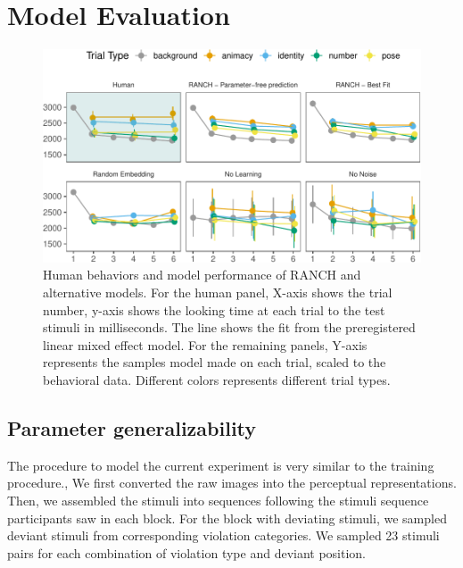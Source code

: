 \documentclass[10pt, letterpaper]{article}
\newenvironment{CodeChunk}{}{}
\begin{document}
\hypertarget{model-evaluation}{%
\section{Model Evaluation}\label{model-evaluation}}

\begin{CodeChunk}
\begin{figure}[h!]

{\centering \includegraphics{figs/lol-1} 

}

\caption[Human behaviors and model performance of RANCH and alternative models]{Human behaviors and model performance of RANCH and alternative models. For the human panel, X-axis shows the trial number, y-axis shows the looking time at each trial to the test stimuli in milliseconds. The line shows the fit from the preregistered linear mixed effect model. For the remaining panels, Y-axis represents the samples model made on each trial, scaled to the behavioral data. Different colors represents different trial types.}\label{fig:lol}
\end{figure}
\end{CodeChunk}

\hypertarget{parameter-generalizability}{%
\subsection{Parameter
generalizability}\label{parameter-generalizability}}

The procedure to model the current experiment is very similar to the
training procedure., We first converted the raw images into the
perceptual representations. Then, we assembled the stimuli into
sequences following the stimuli sequence participants saw in each block.
For the block with deviating stimuli, we sampled deviant stimuli from
corresponding violation categories. We sampled 23 stimuli pairs for each
combination of violation type and deviant position.
\end{document}
